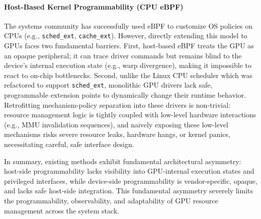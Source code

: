 \paragraph{Host-Based Kernel Programmability (CPU eBPF)}
The systems community has successfully used eBPF to customize OS policies on CPUs (e.g., \texttt{sched\_ext}, \texttt{cache\_ext}). However, directly extending this model to GPUs faces two fundamental barriers. First, host-based eBPF treats the GPU as an opaque peripheral; it can trace driver commands but remains blind to the device's internal execution state (e.g., warp divergence), making it impossible to react to on-chip bottlenecks. Second, unlike the Linux CPU scheduler which was refactored to support \texttt{sched\_ext}, monolithic GPU drivers lack safe, programmable extension points to dynamically change their runtime behavior. Retrofitting mechanism-policy separation into these drivers is non-trivial: resource management logic is tightly coupled with low-level hardware interactions (e.g., MMU invalidation sequences), and naively exposing these low-level mechanisms risks severe resource leaks, hardware hangs, or kernel panics, necessitating careful, safe interface design.

In summary, existing methods exhibit fundamental architectural asymmetry: host-side programmability lacks visibility into GPU-internal execution states and privileged interfaces, while device-side programmability is vendor-specific, opaque, and lacks safe host-side integration. This fundamental asymmetry severely limits the programmability, observability, and adaptability of GPU resource management across the system stack.
